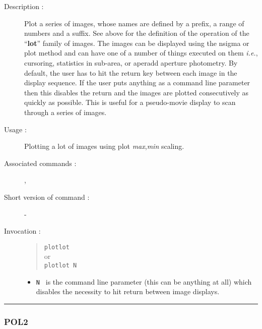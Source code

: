 \begin{description}

\item[Description :] Plot a series of images, whose names are defined
by a prefix, a range of numbers and a suffix. See above for the
definition of the operation of the ``{\bf lot}'' family of images.  The
images can be displayed using the nsigma or plot method and can have
one of a number of things executed on them \emph{i.e.}, cursoring,
statistics in sub-area, or aperadd aperture photometry.  By default,
the user has to hit the return key between each image in the display
sequence.  If the user puts anything as a command line parameter then
this disables the return and the images are plotted consecutively as
quickly as possible.  This is useful for a pseudo-movie display to scan
through a series of images.

\item[Usage :] Plotting a lot of images using plot {\it max},{\it min} scaling.
\item[Associated commands :] {\tt {}}, 
{\tt {}}
\item[Short version of command :] -
\item[Invocation :]

\begin{quote}{\tt  plotlot }\\
or \\
{\tt plotlot N }
\end{quote}

\begin{itemize}

\item {\tt N } is the command line parameter (this can be anything
  at all) which disables the necessity to hit return between
image displays.
\end{itemize}

\end{description}

\hrule 
\subsubsection*{\label{POL2}POL2}

